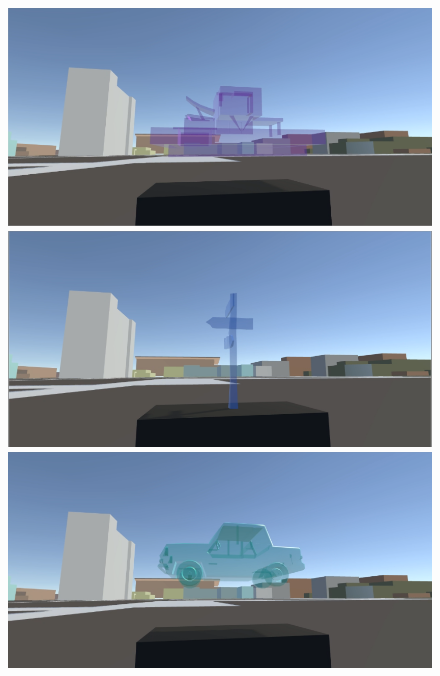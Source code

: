 \begin{appendices}
\begin{figure}
	\includegraphics[width=0.7\linewidth]{figures/tracing_shapes/finalstudy_shapes7}
	\par
	\includegraphics[width=0.7\linewidth]{figures/tracing_shapes/finalstudy_shapes8}
	\par
	\includegraphics[width=0.7\linewidth]{figures/tracing_shapes/finalstudy_shapes9}
	\par
\end{figure}
\begin{figure}
	\centering
	

\end{figure}
\end{appendices}
